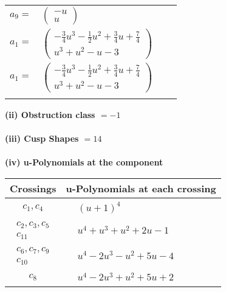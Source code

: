 \documentclass[1p]{elsarticle_modified}
\theoremstyle{definition}
\begin{document}
\begin{tabular}{m{7pt} m{180pt} m{7pt} m{180pt} }
\flushright $a_{9}=$&$\begin{pmatrix}- u\\u\end{pmatrix}$ \\
\flushright $a_{1}=$&$\begin{pmatrix}-\frac{3}{4} u^3-\frac{1}{2} u^2+\frac{3}{4} u+\frac{7}{4}\\u^3+u^2- u-3\end{pmatrix}$\\ \flushright $a_{1}=$&$\begin{pmatrix}-\frac{3}{4} u^3-\frac{1}{2} u^2+\frac{3}{4} u+\frac{7}{4}\\u^3+u^2- u-3\end{pmatrix}$\\&\end{tabular}
\flushleft \textbf{(ii) Obstruction class $= -1$}\\~\\
\flushleft \textbf{(iii) Cusp Shapes $= 14$}\\~\\
\newpage\renewcommand{\arraystretch}{1}
\flushleft \textbf{(iv) u-Polynomials at the component}\newline \\
\begin{tabular}{m{50pt}|m{274pt}}
Crossings & \hspace{64pt}u-Polynomials at each crossing \\
\hline $$\begin{aligned}c_{1},c_{4}\end{aligned}$$&$\begin{aligned}
&(u+1)^4
\end{aligned}$\\
\hline $$\begin{aligned}c_{2},c_{3},c_{5}\\c_{11}\end{aligned}$$&$\begin{aligned}
&u^4+u^3+u^2+2 u-1
\end{aligned}$\\
\hline $$\begin{aligned}c_{6},c_{7},c_{9}\\c_{10}\end{aligned}$$&$\begin{aligned}
&u^4-2 u^3- u^2+5 u-4
\end{aligned}$\\
\hline $$\begin{aligned}c_{8}\end{aligned}$$&$\begin{aligned}
&u^4-2 u^3+u^2+5 u+2
\end{aligned}$\\
\hline
\end{tabular}\\~\\
\end{document}
